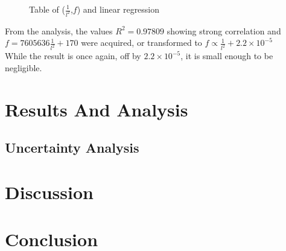 \documentclass[a4paper,12pt]{article}
\begin{document}
    \begin{figure}[H]%
    \begin{center}

    \caption{Table of ($\frac{1}{l^{2}}$,$f$) and linear regression}\label{fig:EXPregression}
    \end{center}
    \end{figure}
    From the analysis, the values $R^2=0.97809$ showing strong correlation and $f=7605636\frac{1}{l^{2}}+170$ were acquired, or transformed to $f\propto\frac{1}{l^{2}}+2.2\times10^{-5}$\\
    While the result is once again, off by $2.2\times10^{-5}$, it is small enough to be negligible.

\section{Results And Analysis}\label{ResultsAnalysis}%
    \subsection{Uncertainty Analysis}
\section{Discussion}%
\section{Conclusion}%

\pagebreak
{}
\printbibliography
\end{document}
